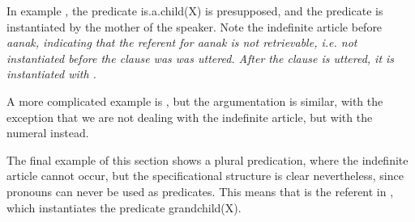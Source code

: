 In example , the predicate is.a.child(X) is presupposed, and the predicate is instantiated by the mother of the speaker. Note the indefinite article before \em aanak\em, indicating that the referent for \em aanak \em is not retrievable, i.e. not instantiated  before the clause was was uttered. After the clause is uttered, it is instantiated with .


A more complicated example is , but the argumentation is similar, with the exception that we are not dealing with the indefinite article, but with the numeral  instead.




The final example of this section shows a plural predication, where the indefinite article cannot occur, but the specificational structure is clear nevertheless, since pronouns can never be used as predicates. This means that  is the referent in , which instantiates the predicate grandchild(X).

\\
 
